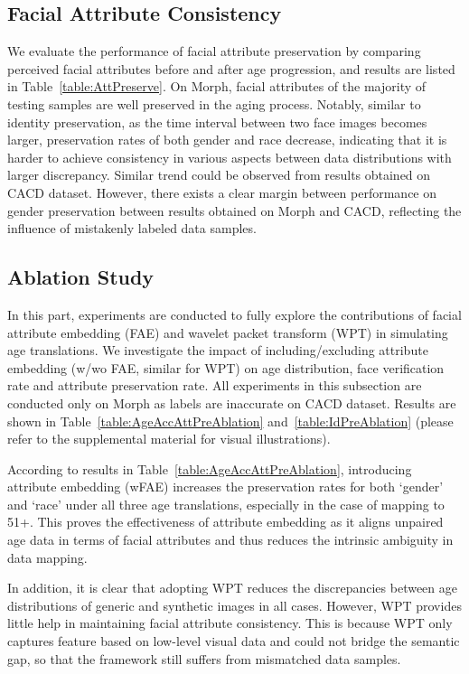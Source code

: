 \documentclass[letterpaper]{article} %
\begin{document}
\subsection{Facial Attribute Consistency}
We evaluate the performance of facial attribute preservation by comparing perceived facial attributes before and after age progression, and results are listed in Table~\ref{table:AttPreserve}. 
On Morph, facial attributes of the majority of testing samples are well preserved in the aging process. Notably, similar to identity preservation, as the time interval between two face images becomes larger, preservation rates of both gender and race decrease, indicating that it is harder to achieve consistency  in various aspects between data distributions with larger discrepancy. 
Similar trend could be observed from results obtained on CACD dataset. However, there exists a clear margin between performance on gender preservation between results obtained on Morph and CACD, reflecting the influence of mistakenly labeled data samples.

\subsection{Ablation Study}

In this part, experiments are conducted to fully explore the contributions of facial attribute embedding (FAE) and wavelet packet transform (WPT) in simulating age translations. 
We investigate the impact of including/excluding attribute embedding (w/wo FAE, similar for WPT) on age distribution, face verification rate and attribute preservation rate. 
All experiments in this subsection are conducted only on Morph as labels are inaccurate on CACD dataset. Results are shown in Table~\ref{table:AgeAccAttPreAblation} and~\ref{table:IdPreAblation} (please refer to the supplemental material for visual illustrations).

According to results in Table~\ref{table:AgeAccAttPreAblation}, introducing attribute embedding (wFAE) increases the preservation rates for both `gender' and `race' under all three age translations, especially in the case of mapping to 51+. 
This proves the effectiveness of attribute embedding as it aligns unpaired age data in terms of facial attributes and thus reduces the intrinsic ambiguity in data mapping. 

In addition, it is clear that adopting WPT reduces the discrepancies between age distributions of generic and synthetic images in all cases. 
However, WPT provides little help in maintaining facial attribute consistency.
This is because WPT only captures feature based on low-level visual data and could not bridge the semantic gap, so that the framework still suffers from mismatched data samples.
\end{document}
